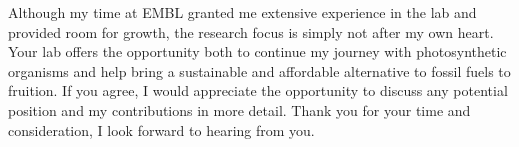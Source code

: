 \documentclass[11pt,a4paper,sans]{moderncv}
\begin{document}
\begin{spacing}{1.15}
Although my time at EMBL granted me extensive experience in the lab and provided room for growth, the research focus is simply not after my own heart.
Your lab offers the opportunity both to continue my journey with photosynthetic organisms and help bring a sustainable and affordable alternative to fossil fuels to fruition. 
If you agree, I would appreciate the opportunity to discuss any potential position and my contributions in more detail. 
Thank you for your time and consideration, I look forward to hearing from you.


 

\end{spacing}
\makeletterclosing
\end{document}
